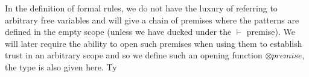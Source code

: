In the definition of formal rules, we do not have the luxury of referring to arbitrary
free variables and will give a chain of premises where the patterns are defined
in the empty scope (unless we have ducked under the $\vdash$ premise). We will later
require the ability to open such premises when using them to establish trust in
an arbitrary scope and so we define such an opening function $⊗premise$, the type
is also given here.
Ty
\begin{code}%
\>[0]\AgdaSpace{}%
%
\>[11]\AgdaSymbol{(}\AgdaSpace{}%
\AgdaSymbol{:}\AgdaSpace{}%
\AgdaSpace{}%
\AgdaSymbol{)}\AgdaSpace{}%
\AgdaSymbol{(}\AgdaSpace{}%
\AgdaSymbol{:}\AgdaSpace{}%
\AgdaSpace{}%
\AgdaSymbol{)}\AgdaSpace{}%
\AgdaSymbol{(}\AgdaSpace{}%
\AgdaSymbol{:}\AgdaSpace{}%
\AgdaSymbol{)}\AgdaSpace{}%
\AgdaSymbol{:}\<%
\\
%
\>[11]\AgdaSymbol{(}\AgdaSpace{}%
\AgdaSymbol{:}\AgdaSpace{}%
\AgdaSpace{}%
\AgdaSymbol{)}\AgdaSpace{}%
\AgdaSpace{}%
\AgdaSymbol{(}\AgdaSpace{}%
\AgdaSymbol{:}\AgdaSpace{}%
\AgdaSpace{}%
\AgdaSymbol{)}\AgdaSpace{}%
\AgdaSpace{}%
\AgdaSpace{}%
\<%
\\
\>[0][@{}l@{\AgdaIndent{0}}]%
\>[3]%
\>[12]\AgdaSymbol{:}\AgdaSpace{}%
\AgdaSymbol{(}\AgdaSpace{}%
\AgdaSymbol{:}\AgdaSpace{}%
\AgdaSpace{}%
\AgdaSpace{}%
\AgdaSymbol{)}\AgdaSpace{}%
\AgdaSpace{}%
\AgdaSymbol{(}\AgdaSpace{}%
\AgdaSymbol{:}\AgdaSpace{}%
\AgdaSpace{}%
\AgdaSpace{}%
\AgdaSymbol{)}\AgdaSpace{}%
\AgdaSpace{}%
\AgdaSpace{}%
\AgdaSpace{}%
\AgdaSpace{}%
\AgdaSpace{}%
\AgdaSymbol{(}\AgdaSpace{}%
\AgdaSymbol{)}\AgdaSpace{}%
\AgdaSymbol{(}\AgdaSpace{}%
\AgdaOperator{\AgdaFunction{-}}\AgdaSpace{}%
\AgdaSymbol{)}\<%
\\
%
\>[3]%
\>[12]\AgdaSymbol{:}\AgdaSpace{}%
\AgdaSymbol{(}\AgdaSpace{}%
\AgdaSymbol{:}\AgdaSpace{}%

\end{code}
